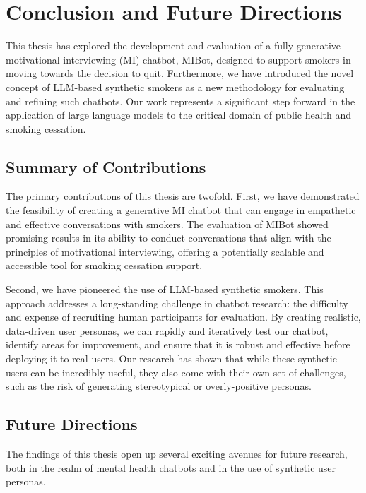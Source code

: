 \chapter{Conclusion and Future Directions}
\label{ch:conclusion}

This thesis has explored the development and evaluation of a fully generative motivational interviewing (MI) chatbot, MIBot, designed to support smokers in moving towards the decision to quit. Furthermore, we have introduced the novel concept of LLM-based synthetic smokers as a new methodology for evaluating and refining such chatbots. Our work represents a significant step forward in the application of large language models to the critical domain of public health and smoking cessation.

\section{Summary of Contributions}

The primary contributions of this thesis are twofold. First, we have demonstrated the feasibility of creating a generative MI chatbot that can engage in empathetic and effective conversations with smokers. The evaluation of MIBot showed promising results in its ability to conduct conversations that align with the principles of motivational interviewing, offering a potentially scalable and accessible tool for smoking cessation support.

Second, we have pioneered the use of LLM-based synthetic smokers. This approach addresses a long-standing challenge in chatbot research: the difficulty and expense of recruiting human participants for evaluation. By creating realistic, data-driven user personas, we can rapidly and iteratively test our chatbot, identify areas for improvement, and ensure that it is robust and effective before deploying it to real users. Our research has shown that while these synthetic users can be incredibly useful, they also come with their own set of challenges, such as the risk of generating stereotypical or overly-positive personas.

\section{Future Directions}

The findings of this thesis open up several exciting avenues for future research, both in the realm of mental health chatbots and in the use of synthetic user personas.

